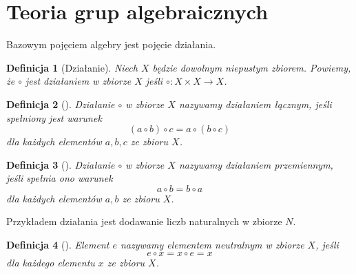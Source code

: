 \documentclass[12pt,a4paper]{report}
\newtheorem{definition}{Definicja}[chapter]
\begin{document}
\section{Teoria grup algebraicznych}

Bazowym pojęciem algebry jest pojęcie działania.

\begin{definition}[Działanie{\citep[Sec 4.1]{jedrzejewski2011algebra}}]
Niech $X$ będzie dowolnym niepustym zbiorem. Powiemy, że $\circ$ jest działaniem w zbiorze $X$ jeśli $\circ: X \times X \to X$.
\end{definition}


\begin{definition}[{\citep[Sec 4.1 Def. 4.3]{jedrzejewski2011algebra}}]
Działanie $\circ$ w zbiorze $X$ nazywamy działaniem łącznym, jeśli spełniony jest warunek 
\begin{equation*}
(a\circ b)\circ c = a\circ(b\circ c)
\end{equation*} 
dla każdych elementów $a,b,c$ ze zbioru $X$.
\end{definition}
\begin{definition}[{\citep[Sec 4.1 Def. 4.4]{jedrzejewski2011algebra}}]
Działanie $\circ$ w zbiorze $X$ nazywamy działaniem przemiennym, jeśli spełnia ono warunek
\begin{equation*}
a\circ b=b\circ a
\end{equation*}
dla każdych elementów $a,b$ ze zbioru $X$.
\end{definition}
Przykładem działania jest dodawanie liczb naturalnych w zbiorze $N$.
\begin{definition}[{\citep[Sec 4.1 Def. 4.8]{jedrzejewski2011algebra}}]
Element $e$ nazywamy elementem neutralnym w zbiorze $X$, jeśli 
\begin{equation*}
e\circ x = x\circ e = x
\end{equation*}
dla każdego elementu $x$ ze zbioru $X$.
\end{definition}
\end{document}

